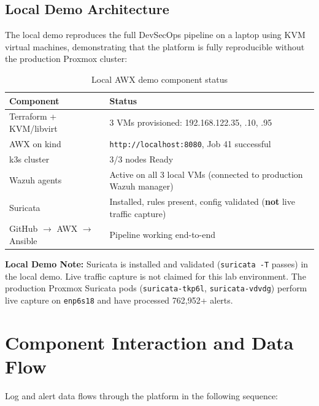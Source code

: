 \documentclass[12pt,a4paper]{report}
\begin{document}
\subsection{Local Demo Architecture}

The local demo reproduces the full DevSecOps pipeline on a laptop using KVM virtual machines, demonstrating that the platform is fully reproducible without the production Proxmox cluster:

\begin{table}[H]
\centering
\caption{Local AWX demo component status}
\begin{tabular}{ll}
\toprule
\textbf{Component} & \textbf{Status} \\
\midrule
Terraform + KVM/libvirt & 3 VMs provisioned: 192.168.122.35, .10, .95 \\
AWX on kind & \texttt{http://localhost:8080}, Job 41 successful \\
k3s cluster & 3/3 nodes Ready \\
Wazuh agents & Active on all 3 local VMs (connected to production Wazuh manager) \\
Suricata & Installed, rules present, config validated (\textbf{not} live traffic capture) \\
GitHub $\rightarrow$ AWX $\rightarrow$ Ansible & Pipeline working end-to-end \\
\bottomrule
\end{tabular}
\label{tab:localdemo}
\end{table}

\begin{infobox}
\textbf{Local Demo Note:} Suricata is installed and validated (\texttt{suricata -T} passes) in the local demo. Live traffic capture is not claimed for this lab environment. The production Proxmox Suricata pods (\texttt{suricata-tkp6l}, \texttt{suricata-vdvdg}) perform live capture on \texttt{enp6s18} and have processed 762,952+ alerts.
\end{infobox}

\section{Component Interaction and Data Flow}

Log and alert data flows through the platform in the following sequence:
\end{document}
